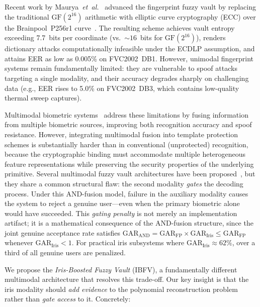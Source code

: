 \documentclass[conference]{IEEEtran}
\newcommand{\IBFV}{\textsf{IBFV}}
\newcommand{\GAR}{\mathrm{GAR}}
\begin{document}
Recent work by Maurya~\textit{et~al.}~\cite{maurya2025enhancing} advanced the fingerprint fuzzy vault by replacing the traditional $\text{GF}(2^{16})$ arithmetic with elliptic curve cryptography (ECC) over the Brainpool~P256r1 curve~\cite{rfc5639}. The resulting scheme achieves vault entropy exceeding 7.7~bits per coordinate (vs.\ $\sim\!16$~bits for $\text{GF}(2^{16})$), renders dictionary attacks computationally infeasible under the ECDLP assumption, and attains EER as low as 0.005\% on FVC2002~DB1. However, unimodal fingerprint systems remain fundamentally limited: they are vulnerable to spoof attacks targeting a single modality, and their accuracy degrades sharply on challenging data (e.g., EER rises to 5.0\% on FVC2002~DB3, which contains low-quality thermal sweep captures).

Multimodal biometric systems~\cite{ross2003information,jain2004multibiometrics} address these limitations by fusing information from multiple biometric sources, improving both recognition accuracy and spoof resistance. However, integrating multimodal fusion into template protection schemes is substantially harder than in conventional (unprotected) recognition, because the cryptographic binding must accommodate multiple heterogeneous feature representations while preserving the security properties of the underlying primitive. Several multimodal fuzzy vault architectures have been proposed~\cite{nandakumar2008multibiometric,moon2010multibiometric}, but they share a common structural flaw: the second modality \emph{gates} the decoding process. Under this AND-fusion model, failure in the auxiliary modality causes the system to reject a genuine user---even when the primary biometric alone would have succeeded. This \emph{gating penalty} is not merely an implementation artifact; it is a mathematical consequence of the AND-fusion structure, since the joint genuine acceptance rate satisfies $\GAR_{\text{AND}} = \GAR_{\text{FP}} \times \GAR_{\text{Iris}} \leq \GAR_{\text{FP}}$ whenever $\GAR_{\text{Iris}} < 1$. For practical iris subsystems where $\GAR_{\text{Iris}} \approx 62\%$, over a third of all genuine users are penalized.

We propose the \emph{Iris-Boosted Fuzzy Vault} (\IBFV{}), a fundamentally different multimodal architecture that resolves this trade-off. Our key insight is that the iris modality should \emph{add evidence} to the polynomial reconstruction problem rather than \emph{gate access} to it. Concretely:
\end{document}
